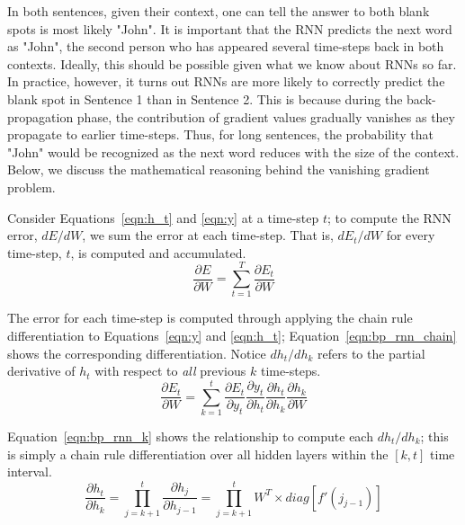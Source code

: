 \documentclass{tufte-handout}
\begin{document}
\null
\justify
In both sentences, given their context, one can tell the answer to both blank spots is most likely "John". It is important that the RNN predicts the next word as "John", the second person who has appeared several time-steps back in both contexts. Ideally, this should be possible given what we know about RNNs so far. In practice, however, it turns out RNNs are more likely to correctly predict the blank spot in Sentence 1 than in Sentence 2. This is because during the back-propagation phase, the contribution of gradient values gradually vanishes as they propagate to earlier time-steps. Thus, for long sentences, the probability that "John" would be recognized as the next word reduces with the size of the context. Below, we discuss the mathematical reasoning behind the vanishing gradient problem.

Consider Equations~\ref{eqn:h_t} and \ref{eqn:y} at a time-step $t$; to compute the RNN error, $dE/dW$, we sum the error at each time-step. That is, $dE_t/dW$ for every time-step, $t$, is computed and accumulated.
\begin{equation}
	\dfrac{\partial E}{\partial W} = \sum_{t=1}^{T}\dfrac{\partial E_t}{\partial W}
	\label{eqn:bp_rnn_error}
\end{equation}

The error for each time-step is computed through applying the chain rule differentiation to Equations~\ref{eqn:y} and \ref{eqn:h_t}; Equation~\ref{eqn:bp_rnn_chain} shows the corresponding differentiation. Notice $dh_t/dh_k$ refers to the partial derivative of $h_t$ with respect to \textit{all} previous $k$ time-steps. 
\begin{equation}
	\dfrac{\partial E_t}{\partial W} = \sum_{k=1}^{t} \dfrac{\partial E_t}{\partial y_t} \dfrac{\partial y_t}{\partial h_t} \dfrac{\partial h_t}{\partial h_k} \dfrac{\partial h_k}{\partial W}
	\label{eqn:bp_rnn_chain}
\end{equation}

Equation~\ref{eqn:bp_rnn_k} shows the relationship to compute each $dh_t/dh_k$; this is simply a chain rule differentiation over all hidden layers within the $[k, t]$ time interval. 
\begin{equation}
	\dfrac{\partial h_t}{\partial h_k} = \prod_{j=k+1}^{t}\dfrac{\partial h_j}{\partial h_{j-1}} = \prod_{j=k+1}^{t}W^T \times diag [f'(j_{j-1})]
	\label{eqn:bp_rnn_k}
\end{equation}
\end{document}
